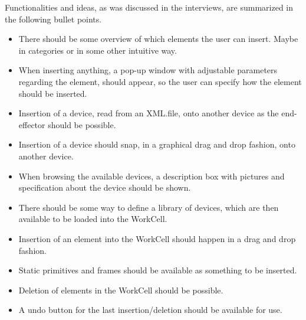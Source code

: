 Functionalities and ideas, as was discussed in the interviews, are summarized in the following bullet points.

\begin{itemize}
\item There should be some overview of which elements the user can insert. Maybe in categories or in some other intuitive way.
\item When inserting anything, a pop-up window with adjustable parameters regarding the element, should appear, so the user can specify how the element should be inserted.
\item Insertion of a device, read from an XML.file, onto another device as the end-effector should be possible.
\item Insertion of a device should snap, in a graphical drag and drop fashion, onto another device.
\item When browsing the available devices, a description box with pictures and specification about the device should be shown.
\item There should be some way to define a library of devices, which are then available to be loaded into the WorkCell.
\item Insertion of an element into the WorkCell should happen in a drag and drop fashion.
\item Static primitives and frames should be available as something to be inserted.
\item Deletion of elements in the WorkCell should be possible.
\item A undo button for the last insertion/deletion should be available for use.
\end{itemize}











